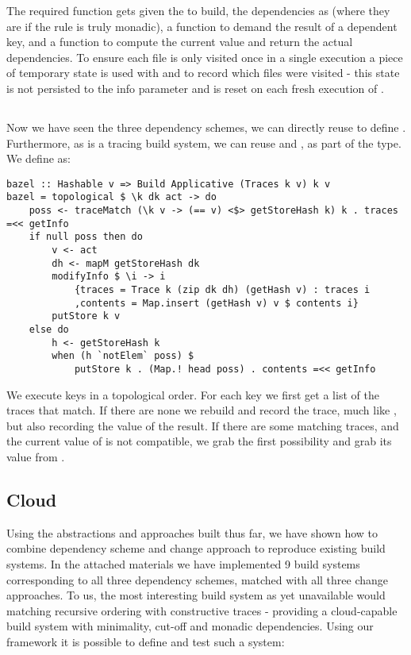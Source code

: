 The required  function gets given the  to build, the dependencies as  (where they are  if the rule is truly monadic), a function to demand the result of a dependent key, and a function to compute the current value and return the actual dependencies. To ensure each file is only visited once in a single execution a piece of temporary state is used with  and  to record which files were visited - this state is not persisted to the  info parameter and is reset on each fresh execution of .

\subsection{\Bazel}\label{sec-implementation-bazel}

Now we have seen the three dependency schemes, we can directly reuse  to define \Bazel. Furthermore, as \Bazel is a tracing build system, we can reuse  and , as part of the  type. We define \Bazel as:

\begin{verbatim}
bazel :: Hashable v => Build Applicative (Traces k v) k v
bazel = topological $ \k dk act -> do
    poss <- traceMatch (\k v -> (== v) <$> getStoreHash k) k . traces =<< getInfo
    if null poss then do
        v <- act
        dh <- mapM getStoreHash dk
        modifyInfo $ \i -> i
            {traces = Trace k (zip dk dh) (getHash v) : traces i
            ,contents = Map.insert (getHash v) v $ contents i}
        putStore k v
    else do
        h <- getStoreHash k
        when (h `notElem` poss) $
            putStore k . (Map.! head poss) . contents =<< getInfo
\end{verbatim}

We execute keys in a topological order. For each key we first get a list of the traces that match. If there are none we rebuild and record the trace, much like \Shake, but also recording the value of the result. If there are some matching traces, and the current value of  is not compatible, we grab the first possibility and grab its value from .

\subsection{Cloud \Shake}\label{sec-implementation-cloud-shake}

Using the abstractions and approaches built thus far, we have shown how to combine dependency scheme and change approach to reproduce existing build systems. In the attached materials we have implemented 9 build systems corresponding to all three dependency schemes, matched with all three change approaches. To us, the most interesting build system as yet unavailable would matching recursive ordering with constructive traces - providing a cloud-capable build system with minimality, cut-off and monadic dependencies. Using our framework it is possible to define and test such a system:

